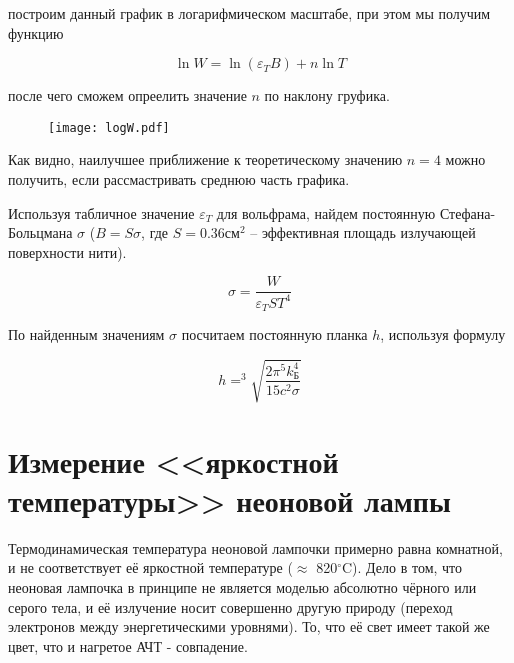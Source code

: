 	построим данный график в логарифмическом масштабе, при этом мы получим функцию

	\begin{equation*}
		\ln W = \ln (\varepsilon_T B) + n \ln T
	\end{equation*}

	после чего сможем опреелить значение $n$ по наклону груфика.

	\begin{figure}[h]
		\centering
		\texttt{[image: logW.pdf]}
		\label{fig:logW}
	\end{figure}

	Как видно, наилучшее приближение к теоретическому значению $n = 4$ можно получить, если рассмастривать среднюю часть графика.

	Используя табличное значение $\varepsilon_T$ для вольфрама, найдем постоянную Стефана-Больцмана $\sigma$ 
	($B = S \sigma$, где $S = 0.36 \text{см}^2$ -- эффективная площадь излучающей поверхности нити). 

	\[\sigma = \frac{W}{\varepsilon_T S T^4} \]

	По найденным значениям $\sigma$ посчитаем постоянную планка $h$, используя формулу

	\[ h = ^3\sqrt{\frac{2 \pi^5 k_{\text{Б}}^4}{15 c^2 \sigma}} \]

	\section*{Измерение <<яркостной температуры>> неоновой лампы}

	Термодинамическая температура неоновой лампочки примерно равна комнатной, и не соответствует её яркостной температуре ($\approx$ 820$^{\circ}$C). 
	Дело в том, что неоновая лампочка в принципе не является моделью абсолютно чёрного или серого тела, 
	и её излучение носит совершенно другую природу (переход электронов между энергетическими уровнями). 
	То, что её свет имеет такой же цвет, что и нагретое АЧТ - совпадение.
